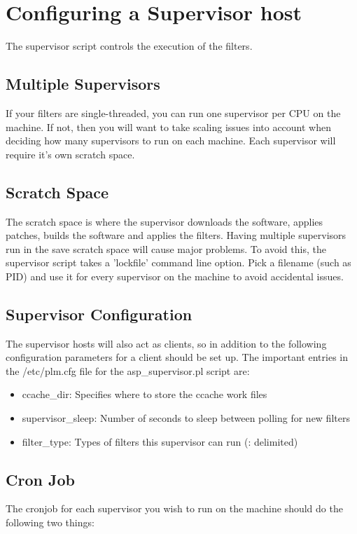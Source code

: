 \section {Configuring a Supervisor host}
The supervisor script controls the execution of the filters.  

\subsection{Multiple Supervisors}
If your filters are single-threaded, you can run one supervisor per CPU on the machine.
If not, then you will want to take scaling issues into account when deciding how many 
supervisors to run on each machine.  Each supervisor will require it's own scratch space.

\subsection{Scratch Space}
The scratch space is where the supervisor downloads the software, applies patches, builds
the software and applies the filters.  Having multiple supervisors run in the save 
scratch space will cause major problems.  To avoid this, the supervisor script takes a
'lockfile' command line option.  Pick a filename (such as PID) and use it for every
supervisor on the machine to avoid accidental issues.

\subsection{Supervisor Configuration}
The supervisor hosts will also act as clients, so in addition to the following configuration parameters for a client should be set up. The important entries in the /etc/plm.cfg file for the asp\_supervisor.pl script are:

\begin{itemize}
\item ccache\_dir: Specifies where to store the ccache work files
\item supervisor\_sleep: Number of seconds to sleep between polling for new filters
\item filter\_type: Types of filters this supervisor can run (: delimited)
\end{itemize}

\subsection{Cron Job}
The cronjob for each supervisor you wish to run on the machine should do the following two things:

